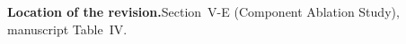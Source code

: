\documentclass[11pt]{article}
\newcommand{\rsp}{\medskip\noindent\textbf{Response.}\quad}
\newcommand{\loc}{\medskip\noindent\textbf{Location of the revision.}\quad}
\begin{document}
\loc Section~V-E (Component Ablation Study), manuscript Table~IV.




\end{document}
